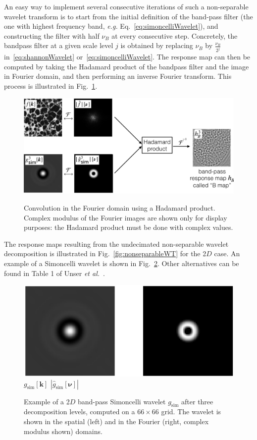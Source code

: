 \documentclass[fleqn,a4paper,oneside,openany]{book}
\begin{document}
An easy way to implement several consecutive iterations of such a non-separable wavelet transform is to start from the initial definition of the band-pass filter (the one with highest frequency band, \emph{e.g.} Eq.~\eqref{eq:simoncelliWavelet}), and constructing the filter with half $\nu_B$ at every consecutive step. Concretely, the bandpass filter at a given scale level $j$ is obtained by replacing $\nu_B$ by $\frac{\nu_B}{2^j}$ in~\eqref{eq:shannonWavelet} or~\eqref{eq:simoncelliWavelet}.
The response map can then be computed by taking the Hadamard product of the bandpass filter and the image in Fourier domain, and then performing an inverse Fourier transform.
This process is illustrated in Fig.~\ref{fig:hadamardConv}.
%
\begin{figure}
\centering
\includegraphics[trim = 0 0 0 0, clip, width=1\linewidth]{hadamardConv.png}\\
\caption{Convolution in the Fourier domain using a Hadamard product. Complex modulus of the Fourier images are shown only for display purposes: the Hadamard product must be done with complex values.}
  \label{fig:hadamardConv}
\end{figure}
%

The response maps resulting from the undecimated non-separable wavelet decomposition is illustrated in Fig.~\ref{fig:nonseparableWT} for the 2$D$ case.
An example of a Simoncelli wavelet is shown in Fig.~\ref{fig:simoncelli}.
Other alternatives can be found in Table 1 of Unser \textit{et al.}~\cite{UCV2011}.
%
\begin{figure}
\centering
\includegraphics[trim = 0 0 0 0, clip, width=0.6\linewidth]{Simoncelli.png}\\
$g_{\text{sim}}[\boldsymbol{k}]$
\hspace{3.05cm}
$|\hat{g}_{\text{sim}}[\boldsymbol{\nu}]|$
\caption{Example of a 2$D$ band-pass Simoncelli wavelet $g_{\text{sim}}$ after three decomposition levels, computed on a $66\times 66$ grid.
The wavelet is shown in the spatial (left) and in the Fourier (right, complex modulus shown) domains.}
  \label{fig:simoncelli}
\end{figure}
%
\end{document}
